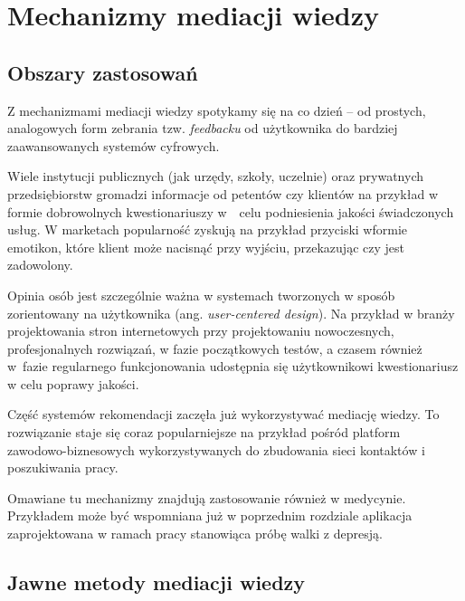 \chapter{Mechanizmy mediacji wiedzy}
\label{cha:mechanizmyMediacjiWiedzy}


\section{Obszary zastosowań}
\label{sec:obszaryZastosowan}

Z mechanizmami mediacji wiedzy spotykamy się na co dzień -- od prostych, analogowych form zebrania tzw. \textit{feedbacku} od użytkownika do bardziej zaawansowanych systemów cyfrowych.

Wiele instytucji publicznych (jak urzędy, szkoły, uczelnie) oraz prywatnych przedsiębiorstw gromadzi informacje od petentów czy klientów na przykład w formie dobrowolnych kwestionariuszy w~~celu podniesienia jakości świadczonych usług. W marketach popularność zyskują na przykład przyciski wformie emotikon, które klient może  nacisnąć przy wyjściu, przekazując czy jest zadowolony.
	
Opinia osób jest szczególnie ważna w systemach tworzonych w sposób zorientowany na użytkownika (ang. \textit{user-centered design}). Na przykład w branży projektowania stron internetowych przy projektowaniu nowoczesnych, profesjonalnych rozwiązań, w fazie początkowych testów, a czasem również w~fazie regularnego funkcjonowania udostępnia się użytkownikowi kwestionariusz w celu poprawy jakości.
	
Część systemów rekomendacji zaczęła już wykorzystywać mediację wiedzy. To rozwiązanie staje się coraz popularniejsze na przykład pośród platform zawodowo-biznesowych wykorzystywanych do zbudowania sieci kontaktów i poszukiwania pracy.
	
Omawiane tu mechanizmy znajdują zastosowanie również w medycynie. Przykładem może być wspomniana już w poprzednim rozdziale aplikacja zaprojektowana w ramach pracy \cite{hung2016predicting} stanowiąca próbę walki z depresją.



\section{Jawne metody mediacji wiedzy}
\label{sec:jawneMetodyMediacjiWiedzy}

